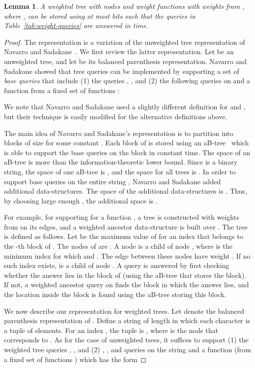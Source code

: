 \documentclass[12pt]{article}
\newtheorem{lemma}[theorem]{Lemma}
\begin{document}
\begin{lemma}\label{lem:weighted-tree}
A weighted tree with  nodes and  weight functions with weights
from , where , can be stored using at most
 bits such
that the queries in Table~\ref{tab:weight-queries} are answered
in  time.
\end{lemma}
\begin{proof}
The representation is a variation of the unweighted tree representation
of Navarro and Sadakane~\cite{NavarroS14}.
We first review the latter representation.
Let  be an unweighted tree, and let  be its balanced parenthesis
representation.
Navarro and Sadakane showed that tree queries can be implemented by
supporting a set of \emph{base queries} that include
(1) the queries , , and 
(2) the following queries on  and a function
 from a fixed set of functions :

We note that Navarro and Sadakane used a slightly different definition for
 and , but their technique is easily modified for the
alternative definitions above.

The main idea of Navarro and Sadakane's representation is to partition 
into blocks of size  for some constant .
Each block of  is stored using an aB-tree~\cite{Patrascu08} which
is able to support the base queries on the block in constant time.
The space of an aB-tree is  more than the information-theoretic lower
bound.
Since  is a binary string, the space of one aB-tree is ,
and the space for all trees is .
In order to support base queries on the entire string ,
Navarro and Sadakane added additional data-structures.
The space of the additional data-structures is .
Thus, by choosing large enough , the additional space is .

For example, for supporting  for a function ,
a tree  is constructed with weights from  on its edges,
and a weighted ancestor data-structure is built over .
The tree  is defined as follows.
Let  be the maximum value of  for an
index  that belongs to the -th block of .
The nodes of  are .
A node  is a child of node , where  is the minimum index for which
 and . The edge between these nodes have weight
.
If no such index exists,  is a child of node .
A  query is answered by first checking whether
the answer lies in the block of  (using the aB-tree that stores the block).
If not, a weighted ancestor query
on  finds the block in which the answer lies, and the location
inside the block is found using the aB-tree storing this block.

We now describe our representation for weighted trees.
Let  denote the balanced parenthesis representation of .
Define a string  of length  in which each
character is a tuple of  elements.
For an index , the tuple  is ,
where  is the node that corresponds to .
As for the case of unweighted trees, it suffices to support
(1) the weighted tree queries
, , and 
(2) , ,  and  queries on the
string  and a function  (from a fixed set of functions )
which has the form


\end{proof}
\end{document}
